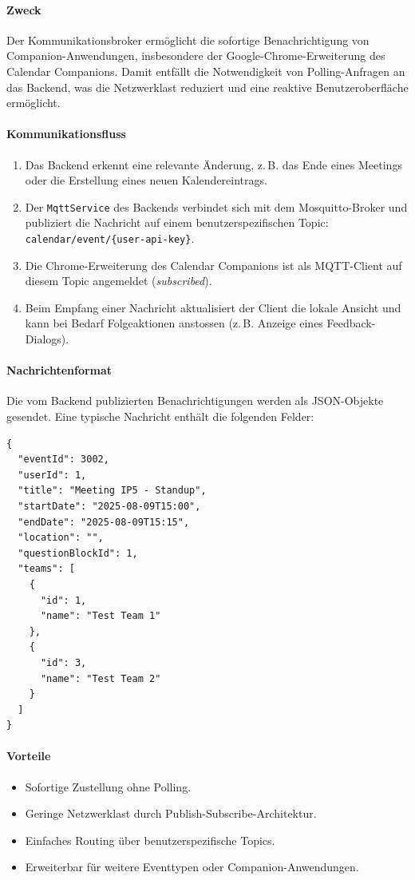 \documentclass[12pt,a4paper]{report}
\begin{document}
\paragraph{Zweck}
Der Kommunikationsbroker ermöglicht die sofortige Benachrichtigung von Companion-Anwendungen, insbesondere der Google-Chrome-Erweiterung des Calendar Companions.
Damit entfällt die Notwendigkeit von Polling-Anfragen an das Backend, was die Netzwerklast reduziert und eine reaktive Benutzeroberfläche ermöglicht.

\paragraph{Kommunikationsfluss}
\begin{enumerate}
  \item Das Backend erkennt eine relevante Änderung, z.\,B. das Ende eines Meetings oder die Erstellung eines neuen Kalendereintrags.
  \item Der \texttt{MqttService} des Backends verbindet sich mit dem Mosquitto-Broker und publiziert die Nachricht auf einem benutzerspezifischen Topic:
        \texttt{calendar/event/\{user-api-key\}}.
  \item Die Chrome-Erweiterung des Calendar Companions ist als MQTT-Client auf diesem Topic angemeldet (\textit{subscribed}).
  \item Beim Empfang einer Nachricht aktualisiert der Client die lokale Ansicht und kann bei Bedarf Folgeaktionen anstossen (z.\,B. Anzeige eines Feedback-Dialogs).
\end{enumerate}

\paragraph{Nachrichtenformat}
Die vom Backend publizierten Benachrichtigungen werden als JSON-Objekte gesendet.
Eine typische Nachricht enthält die folgenden Felder:

\begin{verbatim}
{
  "eventId": 3002,
  "userId": 1,
  "title": "Meeting IP5 - Standup",
  "startDate": "2025-08-09T15:00",
  "endDate": "2025-08-09T15:15",
  "location": "",
  "questionBlockId": 1,
  "teams": [
    {
      "id": 1,
      "name": "Test Team 1"
    },
    {
      "id": 3,
      "name": "Test Team 2"
    }
  ]
}
\end{verbatim}

\paragraph{Vorteile}
\begin{itemize}
  \item Sofortige Zustellung ohne Polling.
  \item Geringe Netzwerklast durch Publish-Subscribe-Architektur.
  \item Einfaches Routing über benutzerspezifische Topics.
  \item Erweiterbar für weitere Eventtypen oder Companion-Anwendungen.
\end{itemize}
\end{document}
